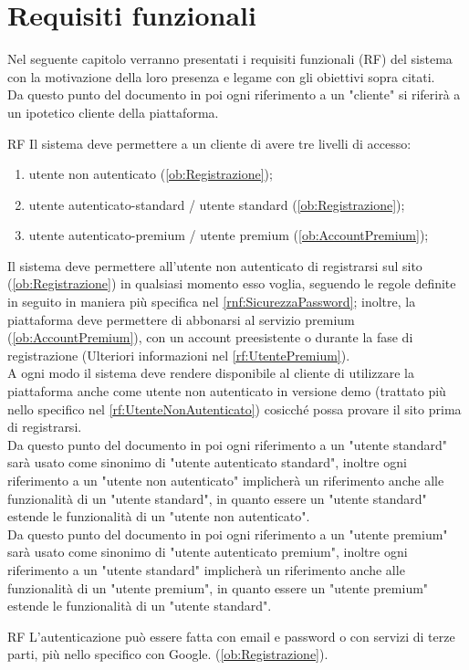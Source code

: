 \section{Requisiti funzionali}
\label{secD1:RequisitiFunzionali}
Nel seguente capitolo verranno presentati i requisiti funzionali (RF) del sistema con la motivazione della loro presenza e legame con gli obiettivi sopra citati.\\
Da questo punto del documento in poi ogni riferimento a un "cliente" si riferirà a un ipotetico cliente della piattaforma.
\begin{listaPersonale}{RF}
	 Il sistema deve permettere a un cliente di avere tre livelli di accesso:
	\begin{enumerate}
		\item utente non autenticato (\ref{ob:Registrazione});
		\item utente autenticato-standard / utente standard (\ref{ob:Registrazione});
		\item utente autenticato-premium / utente premium (\ref{ob:AccountPremium});
	\end{enumerate}
	Il sistema deve permettere all'utente non autenticato di registrarsi sul sito (\ref{ob:Registrazione}) in qualsiasi momento esso voglia, seguendo le regole definite in seguito in maniera più specifica nel \ref{rnf:SicurezzaPassword}; inoltre, la piattaforma deve permettere di abbonarsi al servizio premium (\ref{ob:AccountPremium}), con un account preesistente o durante la fase di registrazione (Ulteriori informazioni nel \ref{rf:UtentePremium}).\\
	A ogni modo il sistema deve rendere disponibile al cliente di utilizzare la piattaforma anche come utente non autenticato in versione demo (trattato più nello specifico nel \ref{rf:UtenteNonAutenticato}) cosicché possa provare il sito prima di registrarsi.\\
	Da questo punto del documento in poi ogni riferimento a un "utente standard" sarà usato come sinonimo di "utente autenticato standard", inoltre ogni riferimento a un "utente non autenticato" implicherà un riferimento anche alle funzionalità di un "utente standard", in quanto essere un "utente standard" estende le funzionalità di un "utente non autenticato".\\
	Da questo punto del documento in poi ogni riferimento a un "utente premium" sarà usato come sinonimo di "utente autenticato premium", inoltre ogni riferimento a un "utente standard" implicherà un riferimento anche alle funzionalità di un "utente premium", in quanto essere un "utente premium" estende le funzionalità di un "utente standard".
	\begin{listaPersonale2}{RF}
		 L'autenticazione può essere fatta con email e password o con servizi di terze parti, più nello specifico con Google. (\ref{ob:Registrazione}).
	\end{listaPersonale2}


\end{listaPersonale}
